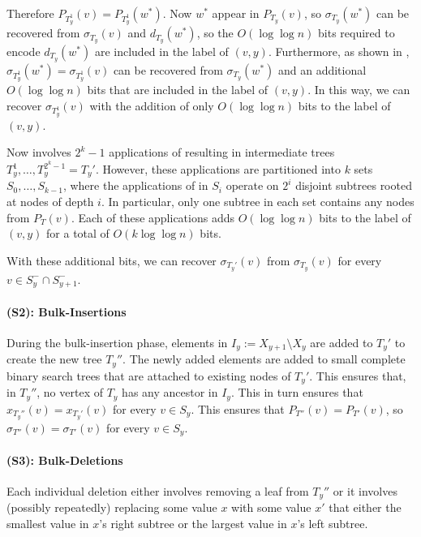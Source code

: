 \documentclass[kpfonts]{patmorin}
\begin{document}
Therefore $P_{T_y^1}(v)=P_{T_y^1}(w^*)$.  Now $w^*$ appear in $P_{T_y}(v)$, so $\sigma_{T_y}(w^*)$ can be recovered from $\sigma_{T_y}(v)$ and $d_{T_y}(w^*)$, so the $O(\log\log n)$ bits required to encode $d_{T_y}(w^*)$ are included in the label of $(v,y)$.  Furthermore, as shown in , $\sigma_{T_y^1}(w^*)=\sigma_{T_y^1}(v)$ can be recovered from $\sigma_{T_y}(w^*)$ and an additional $O(\log\log n)$ bits that are included in the label of $(v,y)$.  In this way, we can recover $\sigma_{T_y^1}(v)$ with the addition of only $O(\log\log n)$ bits to the label of $(v,y)$.

Now  involves $2^k-1$ applications of  resulting in intermediate trees $T_y^1,\ldots,T_y^{2^k-1}=T_y'$.  However, these applications are partitioned into $k$ sets $S_0,\ldots,S_{k-1}$, where the applications of  in $S_i$ operate on $2^i$ disjoint subtrees rooted at nodes of depth $i$.  In particular, only one subtree in each set contains any nodes from $P_{T}(v)$.  Each of these applications adds $O(\log\log n)$ bits to the label of $(v,y)$ for a total of $O(k\log\log n)$ bits.

With these additional bits, we can recover $\sigma_{T_y'}(v)$ from $\sigma_{T_y}(v)$ for every $v\in S^-_y\cap S^-_{y+1}$.

\paragraph{(S2): Bulk-Insertions}

During the bulk-insertion phase, elements in $I_y:=X_{y+1}\setminus X_y$ are added to $T_y'$ to create the new tree $T_{y}''$.  The newly added elements are added to small complete binary search trees that are attached to existing nodes of $T_{y}'$.  This ensures that, in $T_y''$, no vertex of $T_y$ has any ancestor in $I_y$.  This in turn ensures that $x_{T_y''}(v)=x_{T_y'}(v)$ for every $v\in S_y$.  This ensures that $P_{T''}(v)=P_{T'}(v)$, so $\sigma_{T''}(v)=\sigma_{T'}(v)$ for every $v\in S_y$.

\paragraph{(S3): Bulk-Deletions}

Each individual deletion either involves removing a leaf from $T_y''$ or it involves (possibly repeatedly) replacing some value $x$ with some value $x'$ that either the smallest value in $x$'s right subtree or the largest value in $x$'s left subtree.
\end{document}
